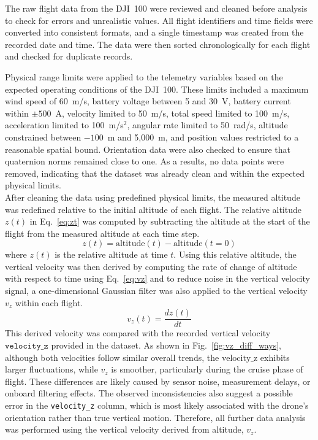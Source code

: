 

The raw flight data from the DJI~100 were reviewed and cleaned before analysis to check for errors and unrealistic values. All flight identifiers and time fields were converted into consistent formats, and a single timestamp was created from the recorded date and time. The data were then sorted chronologically for each flight and checked for duplicate records.

Physical range limits were applied to the telemetry variables based on the expected operating conditions of the DJI~100. These limits included a maximum wind speed of 60~m/s, battery voltage between 5 and 30~V, battery current within $\pm 500$~A, velocity limited to 50~m/s, total speed limited to 100~m/s, acceleration limited to 100~m/s$^2$, angular rate limited to 50~rad/s, altitude constrained between $-100$~m and 5{,}000~m, and position values restricted to a reasonable spatial bound. Orientation data were also checked to ensure that quaternion norms remained close to one. As a results, no data points were removed, indicating that the dataset was already clean and within the expected physical limits.\\

After cleaning the data using predefined physical limits, the measured altitude was redefined relative to the initial altitude of each flight. The relative altitude $z(t)$ in  Eq.~\eqref{eq:zt} was computed by subtracting the altitude at the start of the flight from the measured altitude at each time step.\\
\begin{equation}
    z(t) = \text{altitude}(t) - \text{altitude}(t=0)
    \label{eq:zt}
\end{equation}
where $ z(t) $ is the relative altitude at time $ t $.
Using this relative altitude, the vertical velocity was then derived by computing the rate of change of altitude with respect to time
using Eq.~\eqref{eq:vz} and to reduce noise in the vertical velocity signal, a one-dimensional Gaussian filter was  also applied to the vertical velocity  $v_z$  within each flight.\\
\begin{equation}
v_{z}(t) = \frac{dz(t)}{dt}
\label{eq:vz}
\end{equation}
This derived velocity was compared with the recorded vertical velocity $\texttt{velocity\_z}$ provided in the dataset. As shown in Fig.~\ref{fig:vz_diff_ways}, although both  velocities follow similar overall trends, the $\text{velocity\_z}$ exhibits larger fluctuations, while  $v_z$ is smoother, particularly during the cruise phase of flight. These differences are likely caused by sensor noise, measurement delays, or onboard filtering effects. The observed inconsistencies also suggest a possible error in the \texttt{velocity\_z} column, which is most likely associated with the drone’s orientation rather than true vertical motion. Therefore, all further data analysis was performed using the vertical velocity derived from altitude, $v_z$.

